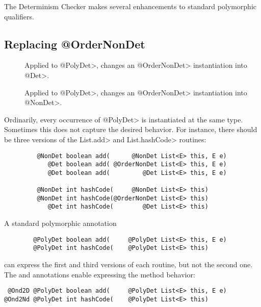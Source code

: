 The Determinism Checker makes
several enhancements to standard polymorphic qualifiers.


\subsection{Replacing @OrderNonDet\label{determinism-polymorphism-ordernondet}}

\begin{description}
\item[]
  Applied to \<@PolyDet>,
  changes an \<@OrderNonDet> instantiation into \<@Det>.
\item[]
  Applied to \<@PolyDet>,
  changes an \<@OrderNonDet> instantiation into \<@NonDet>.
\end{description}

Ordinarily, every occurrence of \<@PolyDet> is instantiated at the same
type.  Sometimes this does not capture the desired behavior.  For instance,
there should be three versions of the \<List.add> and \<List.hashCode> routines:

\begin{Verbatim}
         @NonDet boolean add(      @NonDet List<E> this, E e)
            @Det boolean add( @OrderNonDet List<E> this, E e)
            @Det boolean add(         @Det List<E> this, E e)

         @NonDet int hashCode(     @NonDet List<E> this)
         @NonDet int hashCode(@OrderNonDet List<E> this)
            @Det int hashCode(        @Det List<E> this)
\end{Verbatim}

A standard polymorphic annotation

\begin{Verbatim}
        @PolyDet boolean add(     @PolyDet List<E> this, E e)
        @PolyDet int hashCode(    @PolyDet List<E> this)
\end{Verbatim}

\noindent
can express the first and third versions of each routine, but not the
second one.  The  and
 annotations enable
expressing the method behavior:

\begin{Verbatim}
 @Ond2D @PolyDet boolean add(     @PolyDet List<E> this, E e)
@Ond2Nd @PolyDet int hashCode(    @PolyDet List<E> this)
\end{Verbatim}


